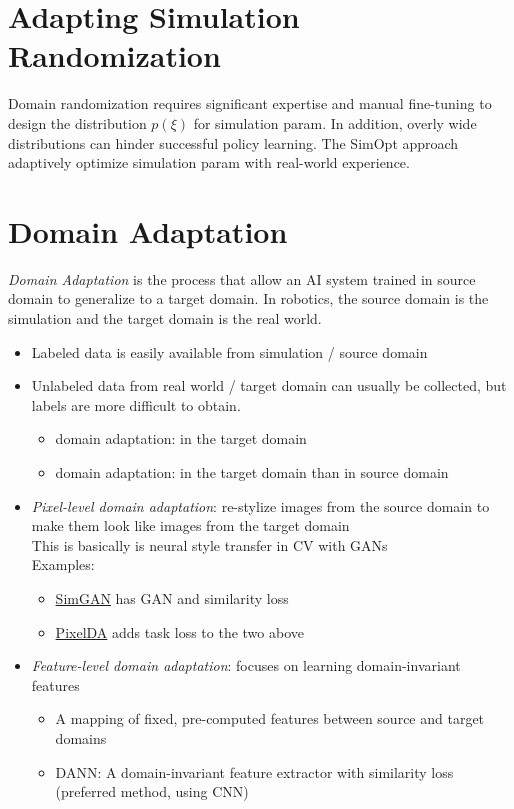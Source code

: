 \section{Adapting Simulation Randomization}
Domain randomization requires significant expertise and manual fine-tuning to design the distribution $ p(\xi) $ for simulation \ac{param}. In addition, overly wide distributions can hinder successful policy learning. The SimOpt approach adaptively optimize simulation \ac{param} with real-world experience. \cite{chebotar2019closing}

\section{Domain Adaptation}
\textit{Domain Adaptation} is the process that allow an \ac{AI} system trained in source domain to generalize to a target domain. In robotics, the source domain is the simulation and the target domain is the real world.
\begin{itemize}
	\item Labeled data is easily available from simulation / source domain
	\item Unlabeled data from real world / target domain can usually be collected, but labels are more difficult to obtain.
	\begin{itemize}
		\item {} domain adaptation:  in the target domain
		\item {} domain adaptation:  in the target domain than in source domain
	\end{itemize}
	\item \textit{Pixel-level domain adaptation}: re-stylize images from the source domain to make them look like images from the target domain\\
	\note This is basically is neural style transfer in \ac{CV} with \ac{GAN}s\\
	Examples:
	\begin{itemize}
		\item \href{https://youtu.be/vDW8qvsBtmQ}{SimGAN} has \ac{GAN} and similarity loss \cite{shrivastava2017learning}
		\item \href{https://youtu.be/VhsTrWPvjcA}{PixelDA} adds task loss to the two above \cite{bousmalis2017unsupervised}
	\end{itemize}
	\item \textit{Feature-level domain adaptation}: focuses on learning domain-invariant features
	\begin{itemize}
		\item A mapping of fixed, pre-computed features between source and target domains \cite{sun2016return}
		\item DANN: A domain-invariant feature extractor with similarity loss (preferred method, using \ac{CNN}) \cite{ganin2016domain}
	\end{itemize}
\end{itemize}

